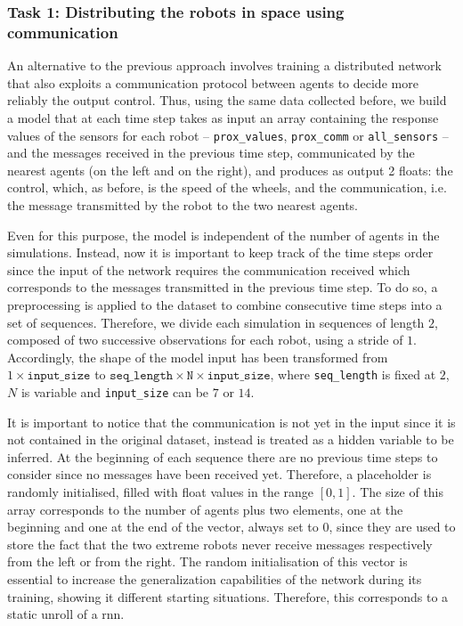 \subsubsection{Task 1: Distributing the robots in space using communication}
\label{subsubsec:task1comm}

An alternative to the previous approach involves training a distributed network 
that also exploits a communication protocol between agents to decide more 
reliably the output control. 
Thus, using the same data collected before, we build a model that at each time 
step takes as input an array containing the response values of the sensors for each 
robot – \texttt{prox\_values}, \texttt{prox\_comm} or \texttt{all\_sensors} – and 
the messages received in the previous time step, communicated by the nearest 
agents (on the left and on the right), and produces as output 2 floats: the control, 
which, as before, is the speed of the wheels, and the communication, i.e. the 
message transmitted by the robot to the two nearest agents.

Even for this purpose, the model is independent of the number of agents in 
the simulations. Instead, now it is important to keep track of the time steps order 
since the input of the network requires the communication received which 
corresponds to the messages transmitted in the previous time step. To do so, a 
preprocessing is applied to the dataset to combine consecutive 
time steps into a set of sequences. Therefore, we divide each simulation in 
sequences of length $2$, composed of two successive observations for each 
robot, using a stride of $1$.   
Accordingly, the shape of the model input has been transformed from $1 \times 
\mathtt{input\_size}$ to $\mathtt{seq\_length} \times \mathtt{N} \times 
\mathtt{input\_size}$, where \texttt{seq\_length} is fixed at $2$, $N$ is variable 
and \texttt{input\_size} can be $7$ or $14$.

It is important to notice that the communication is not yet in the input since 
it is not contained in the original dataset, instead is treated as a hidden 
variable to be inferred. 
At the beginning of each sequence there are no previous time steps to 
consider since no messages have been received yet. Therefore, a placeholder 
is randomly initialised, filled with float values in the range $[0, 1]$. 
The size of this array corresponds to the number of agents plus two 
elements, one at the beginning and one at the end of the vector, always set 
to $0$, since they are used to store the fact that the two extreme robots 
never receive messages respectively from the left or from the right. 
The random initialisation of this vector is essential to increase the 
generalization capabilities of the network during its training, showing it 
different starting situations.
Therefore, this corresponds to a static unroll of a \gls{rnn}.%

